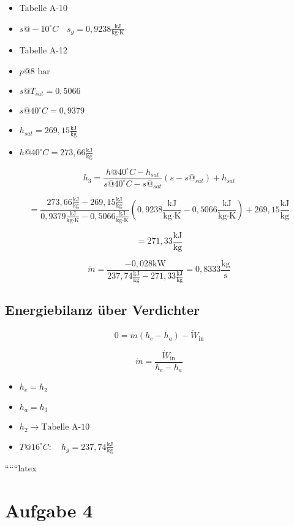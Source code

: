 \begin{itemize}
    \item Tabelle A-10
    \item $s@-10^\circ C \quad s_g = 0,9238 \frac{\text{kJ}}{\text{kg} \cdot \text{K}}$
    \item Tabelle A-12
    \item $p@8 \text{ bar}$
    \item $s@T_{sat} = 0,5066$
    \item $s@40^\circ C = 0,9379$
    \item $h_{sat} = 269,15 \frac{\text{kJ}}{\text{kg}}$
    \item $h@40^\circ C = 273,66 \frac{\text{kJ}}{\text{kg}}$
\end{itemize}

\[
h_3 = \frac{h@40^\circ C - h_{sat}}{s@40^\circ C - s@_{sat}} (s - s@_{sat}) + h_{sat}
\]

\[
= \frac{273,66 \frac{\text{kJ}}{\text{kg}} - 269,15 \frac{\text{kJ}}{\text{kg}}}{0,9379 \frac{\text{kJ}}{\text{kg} \cdot \text{K}} - 0,5066 \frac{\text{kJ}}{\text{kg} \cdot \text{K}}} (0,9238 \frac{\text{kJ}}{\text{kg} \cdot \text{K}} - 0,5066 \frac{\text{kJ}}{\text{kg} \cdot \text{K}}) + 269,15 \frac{\text{kJ}}{\text{kg}}
\]

\[
= 271,33 \frac{\text{kJ}}{\text{kg}}
\]

\[
\dot{m} = \frac{-0,028 \text{kW}}{237,74 \frac{\text{kJ}}{\text{kg}} - 271,33 \frac{\text{kJ}}{\text{kg}}} = 0,8333 \frac{\text{kg}}{\text{s}}
\]

\subsection*{Energiebilanz über Verdichter}

\[
0 = \dot{m} (h_e - h_a) - \dot{W}_{\text{in}}
\]

\[
\dot{m} = \frac{\dot{W}_{\text{in}}}{h_e - h_a}
\]

\begin{itemize}
    \item $h_e = h_2$
    \item $h_a = h_3$
    \item $h_2 \rightarrow \text{Tabelle A-10}$
    \item $T@16^\circ C: \quad h_g = 237,74 \frac{\text{kJ}}{\text{kg}}$
\end{itemize}

``````latex


\section*{Aufgabe 4}